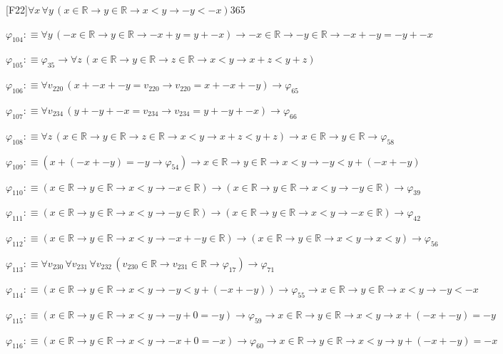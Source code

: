 \begin{fullproof}{[F22]}{$\forall x\,\forall y\,(x \in \mathbb{R} \to y \in \mathbb{R} \to x < y \to -y < -x)$}{365}
\begin{abbrevlist}
\item $\varphi_{104} :\equiv \forall y\,(-x \in \mathbb{R} \to y \in \mathbb{R} \to -x + y = y + -x) \to -x \in \mathbb{R} \to -y \in \mathbb{R} \to -x + -y = -y + -x$
\item $\varphi_{105} :\equiv \varphi_{35} \to \forall z\,(x \in \mathbb{R} \to y \in \mathbb{R} \to z \in \mathbb{R} \to x < y \to x + z < y + z)$
\item $\varphi_{106} :\equiv \forall v_{220}\,(x + -x + -y = v_{220} \to v_{220} = x + -x + -y) \to \varphi_{65}$
\item $\varphi_{107} :\equiv \forall v_{234}\,(y + -y + -x = v_{234} \to v_{234} = y + -y + -x) \to \varphi_{66}$
\item $\varphi_{108} :\equiv \forall z\,(x \in \mathbb{R} \to y \in \mathbb{R} \to z \in \mathbb{R} \to x < y \to x + z < y + z) \to x \in \mathbb{R} \to y \in \mathbb{R} \to \varphi_{58}$
\item $\varphi_{109} :\equiv (x + (-x + -y) = -y \to \varphi_{54}) \to x \in \mathbb{R} \to y \in \mathbb{R} \to x < y \to -y < y + (-x + -y)$
\item $\varphi_{110} :\equiv (x \in \mathbb{R} \to y \in \mathbb{R} \to x < y \to -x \in \mathbb{R}) \to (x \in \mathbb{R} \to y \in \mathbb{R} \to x < y \to -y \in \mathbb{R}) \to \varphi_{39}$
\item $\varphi_{111} :\equiv (x \in \mathbb{R} \to y \in \mathbb{R} \to x < y \to -y \in \mathbb{R}) \to (x \in \mathbb{R} \to y \in \mathbb{R} \to x < y \to -x \in \mathbb{R}) \to \varphi_{42}$
\item $\varphi_{112} :\equiv (x \in \mathbb{R} \to y \in \mathbb{R} \to x < y \to -x + -y \in \mathbb{R}) \to (x \in \mathbb{R} \to y \in \mathbb{R} \to x < y \to x < y) \to \varphi_{56}$
\item $\varphi_{113} :\equiv \forall v_{230}\,\forall v_{231}\,\forall v_{232}\,(v_{230} \in \mathbb{R} \to v_{231} \in \mathbb{R} \to \varphi_{17}) \to \varphi_{71}$
\item $\varphi_{114} :\equiv (x \in \mathbb{R} \to y \in \mathbb{R} \to x < y \to -y < y + (-x + -y)) \to \varphi_{55} \to x \in \mathbb{R} \to y \in \mathbb{R} \to x < y \to -y < -x$
\item $\varphi_{115} :\equiv (x \in \mathbb{R} \to y \in \mathbb{R} \to x < y \to -y + 0 = -y) \to \varphi_{59} \to x \in \mathbb{R} \to y \in \mathbb{R} \to x < y \to x + (-x + -y) = -y$
\item $\varphi_{116} :\equiv (x \in \mathbb{R} \to y \in \mathbb{R} \to x < y \to -x + 0 = -x) \to \varphi_{60} \to x \in \mathbb{R} \to y \in \mathbb{R} \to x < y \to y + (-x + -y) = -x$

\end{abbrevlist}
\end{fullproof}
